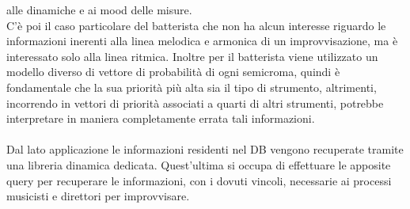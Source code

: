 alle dinamiche e ai mood delle misure.\\
C'è poi il caso particolare del batterista
che non ha alcun interesse riguardo le informazioni inerenti alla linea melodica 
e armonica di un improvvisazione, ma è interessato solo alla linea ritmica. Inoltre
per il batterista viene utilizzato un modello diverso di vettore di probabilità 
di ogni semicroma, quindi è fondamentale che la sua priorità più alta sia il tipo 
di strumento, altrimenti, incorrendo in vettori di priorità associati a quarti di
altri strumenti, potrebbe interpretare in maniera completamente errata tali informazioni.\\\\
Dal lato applicazione le informazioni residenti nel DB vengono recuperate tramite
una libreria dinamica dedicata. Quest'ultima si occupa di effettuare le apposite
query per recuperare le informazioni, con i dovuti vincoli, necessarie ai processi 
musicisti e direttori per improvvisare.
